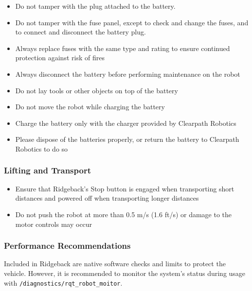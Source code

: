 \documentclass[]{clearpath-latex/clearpath-manual}
\begin{document}
\begin{itemize}[nolistsep]
	\item Do not tamper with the plug attached to the battery.
	\item Do not tamper with the fuse panel, except to check and change the fuses, and to connect and disconnect the 	battery plug.
	\item Always replace fuses with the same type and rating to ensure continued protection against risk of fires
	\item Always disconnect the battery before performing maintenance on the robot
	\item Do not lay tools or other objects on top of the battery
	\item Do not move the robot while charging the battery
	\item Charge the battery only with the charger provided by Clearpath Robotics
	\item Please dispose of the batteries properly, or return the battery to Clearpath Robotics to do so
\end{itemize}

\subsubsection{Lifting and Transport}

\begin{itemize}[nolistsep]
	\item Ensure that Ridgeback's Stop button is engaged when transporting short distances and powered off when transporting longer distances
	\item Do not push the robot at more than 0.5 m/s (1.6 ft/s) or damage to the motor controls may occur
\end{itemize}

\subsubsection{Performance Recommendations}

Included in Ridgeback are native software checks and limits to protect the vehicle. However, it is recommended to monitor the system’s status during usage with \lstinline{/diagnostics/rqt_robot_moitor}.
\end{document}
